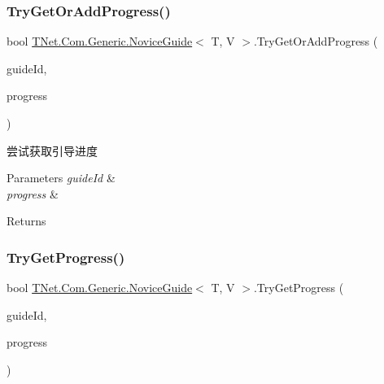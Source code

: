 \subsubsection{\texorpdfstring{Try\+Get\+Or\+Add\+Progress()}{TryGetOrAddProgress()}}
{\footnotesize\ttfamily bool \mbox{\hyperlink{class_t_net_1_1_com_1_1_generic_1_1_novice_guide}{T\+Net.\+Com.\+Generic.\+Novice\+Guide}}$<$ T, V $>$.Try\+Get\+Or\+Add\+Progress (\begin{DoxyParamCaption}\item[{int}]{guide\+Id,  }\item[{out \mbox{\hyperlink{class_t_net_1_1_com_1_1_model_1_1_guide_progress_item}{Guide\+Progress\+Item}}}]{progress }\end{DoxyParamCaption})\hspace{0.3cm}{\ttfamily [protected]}}



尝试获取引导进度 


\begin{DoxyParams}{Parameters}
{\em guide\+Id} & \\
\hline
{\em progress} & \\
\hline
\end{DoxyParams}
\begin{DoxyReturn}{Returns}

\end{DoxyReturn}
\mbox{\label{class_t_net_1_1_com_1_1_generic_1_1_novice_guide_a2d479ba8ed5d702f77d15d144c5ac450}} 
\subsubsection{\texorpdfstring{Try\+Get\+Progress()}{TryGetProgress()}}
{\footnotesize\ttfamily bool \mbox{\hyperlink{class_t_net_1_1_com_1_1_generic_1_1_novice_guide}{T\+Net.\+Com.\+Generic.\+Novice\+Guide}}$<$ T, V $>$.Try\+Get\+Progress (\begin{DoxyParamCaption}\item[{int}]{guide\+Id,  }\item[{out \mbox{\hyperlink{class_t_net_1_1_com_1_1_model_1_1_guide_progress_item}{Guide\+Progress\+Item}}}]{progress }\end{DoxyParamCaption})\hspace{0.3cm}{\ttfamily [protected]}}






